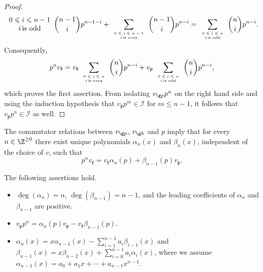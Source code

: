 \documentclass[11pt]{amsart}
\begin{document}
\begin{proof}
\begin{align*}
{\begin{array}{cc}
0\leqslant i\leqslant n-1\\
i \, \text{is odd}
\end{array}}{{n-1} \choose i}p^{n-1-i}+\sum_{\tiny
\begin{array}{cc}
0\leqslant i\leqslant n-1\\
i \, \text{is even}
\end{array}}{n-1 \choose i}p^{n-i}=\sum_{\tiny
\begin{array}{cc}
0\leqslant i\leqslant n\\
i \, \text{is odd}
\end{array}}{{n} \choose i}p^{n-i}.
\end{align*}
Consequently, 
\begin{align*}
p^nv_{\mathfrak k}=v_{\mathfrak k} \sum_{\tiny
\begin{array}{cc}
0\leqslant i\leqslant n\\
i \, \text{is even}
\end{array}}{n \choose i}p^{n-i}+v_{\mathfrak p} \sum_{\tiny
\begin{array}{cc}
0\leqslant i\leqslant n\\
i \, \text{is odd}
\end{array}}{n \choose i}p^{n-i},
\end{align*}
which proves the first assertion. 
From isolating $v_{\g p}p^n$ on the right hand side and using the induction hypothesis that  $v_{\mathfrak p} p^{m} \in \mathcal{I}$ for  $m \leqslant n-1$, it follows that  $v_{\mathfrak p} p^{n} \in \mathcal{I}$ as well.
\end{proof}
The commutator relations between $v_{\g p}$, $v_{\g k}$ and $p$ imply that for every $n\in\Z^{\geq 0}$ there exist unique polynomials $\alpha_n(x)$ and $\beta_n(x)$, independent of the choice of $v$, such that 
\begin{equation}
\label{eq:dfnab}
p^nv_{\mathfrak k}=v_{\mathfrak k}\alpha_{n}(p)+\beta_{n-1}(p)v_{\mathfrak p}.
\end{equation}
\begin{lem}\label{alpha(p)}
The following assertions hold.
\begin{itemize}
\item[\rm (i)] $\deg(\alpha_n)=n$, $\deg(\beta_{n-1})=n-1$, and the leading coefficients of $\alpha_n$ and $\beta_{n-1}$ are positive. 
\item[\rm (ii)]
$v_{\mathfrak p}p^n=\alpha_{n}(p)v_{\mathfrak p}-v_{\mathfrak k}\beta_{n-1}(p)$.
\item[\rm (iii)]
$\alpha_{n}(x)=x\alpha_{n-1}(x)-\sum_{i=1}^{n-1}a_{i}\beta_{i-1}(x)$ and $\beta_{n-1}(x)=x\beta_{n-2}(x)+\sum_{i=0}^{n-1}a_i\alpha_{i}(x)$,
where we assume $\alpha_{n-1}(x)=a_0+a_1x+\cdots +a_{n-1}x^{n-1}$.
\end{itemize}
\end{lem}
\end{document}
